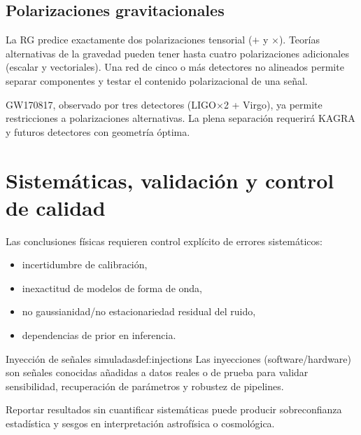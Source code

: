 \subsection{Polarizaciones gravitacionales}

La RG predice exactamente dos polarizaciones tensorial ($+$ y $\times$). Teorías alternativas de la gravedad pueden tener hasta cuatro polarizaciones adicionales (escalar y vectoriales). Una red de cinco o más detectores no alineados permite separar componentes y testar el contenido polarizacional de una señal.

\begin{importante}
GW170817, observado por tres detectores (LIGO$\times$2 + Virgo), ya permite restricciones a polarizaciones alternativas. La plena separación requerirá KAGRA y futuros detectores con geometría óptima.
\end{importante}

\section{Sistemáticas, validación y control de calidad}
\label{sec:sistematicas}

Las conclusiones físicas requieren control explícito de errores sistemáticos:
\begin{itemize}[leftmargin=2em]
  \item incertidumbre de calibración,
  \item inexactitud de modelos de forma de onda,
  \item no gaussianidad/no estacionariedad residual del ruido,
  \item dependencias de prior en inferencia.
\end{itemize}

\begin{definicion}{Inyección de señales simuladas}{def:injections}
Las inyecciones (software/hardware) son señales conocidas añadidas a datos reales o de prueba para validar sensibilidad, recuperación de parámetros y robustez de pipelines.
\end{definicion}

\begin{importante}
Reportar resultados sin cuantificar sistemáticas puede producir sobreconfianza estadística y sesgos en interpretación astrofísica o cosmológica.
\end{importante}

